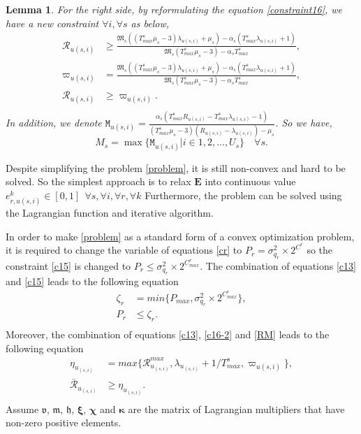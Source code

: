 \documentclass[conference]{IEEEtran}
\newtheorem{lemma}{Lemma}
\begin{document}
\begin{lemma}
For the right side, by reformulating the equation \eqref{constraint16}, we have a new constraint $\forall i, \forall s$ as below,
\begin{equation}\label{RM}
\begin{split}
\mathcal{R}_{u(s,i)} &\geq \frac{\mathfrak{M}_s ((T_{max}^s\mu_s-3)\lambda_{u(s,i)} + \mu_s) - \alpha_s(T_{max}^s\lambda_{u(s,i)} +1) }{\mathfrak{M}_s (T_{max}^s\mu_s-3)-\alpha_s T_{max}^s},\\
\varpi_{u(s,i)} &= \frac{\mathfrak{M}_s ((T_{max}^s\mu_s-3)\lambda_{u(s,i)} + \mu_s) - \alpha_s(T_{max}^s\lambda_{u(s,i)} +1) }{\mathfrak{M}_s (T_{max}^s\mu_s-3)-\alpha_s T_{max}^s},\\
\mathcal{R}_{u(s,i)} &\geq \varpi_{u(s,i)}. \\
\end{split}
\end{equation}
In addition, we denote $\mathtt{M}_{u(s,i)} = \frac{\alpha_s(T_{max}^s R_{u(s,i)}-T_{max}^s\lambda_{u(s,i)} -1)}{(T_{max}^s\mu_s-3)(R_{u(s,i)}-\lambda_{u(s,i)}) - \mu_s }$.
So we have,
\begin{equation}
M_s = \max\{\mathtt{M}_{u(s,i)} | i \in 1,2,..., U_s\} \quad \forall s .
\end{equation}
\end{lemma}
Despite simplifying the problem \eqref{problem}, it is still non-convex and hard to be solved.
So the simplest approach is to relax $\mathbf{E}$ into continuous value $e_{r,u(s,i)}^k \in [0,1] \:\: \forall s , \forall i ,\forall r, \forall k$
Furthermore, the problem can be solved using the Lagrangian function and iterative algorithm.

In order to make \eqref{problem} as a standard form of a convex optimization problem, it is required to change the variable of equations \eqref{cr} to $P_r = \sigma_{q_r}^2\times 2^{C^r}$ so the constraint 
\eqref{c15} is changed to
 $P_r \leq \sigma_{q_r}^2\times 2^{C^r_{max}}$.
The combination of equations \eqref{c13} and \eqref{c15} leads to the following equation
\begin{equation}
\begin{split}
\zeta_{r}&= min\{P_{max}, \sigma_{q_r}^2\times 2^{C^r_{max}} \}, \\
P_r &\leq  \zeta_{r}.\\
\end{split}
\end{equation} 
Moreover, the combination of equations \eqref{c13}, \eqref{c16-2} and \eqref{RM} leads to the following equation
\begin{equation}\label{RConstr}
\begin{split}
\eta_{u_{(s,i)}}&= max\{\mathcal{R}_{u_{(s,i)}}^{max}, \lambda_{u_{(s,i)}}+1/T^s_{max}, \varpi_{u(s,i)} \}, \\
\mathcal{\bar{R}}_{u_{(s,i)}} &\geq  \eta_{u_{(s,i)}}.\\
\end{split}
\end{equation}
Assume $\boldsymbol{\mathfrak{v}}$, $\boldsymbol{\mathfrak{m}}$, $\boldsymbol{\mathfrak{h}}$, $\boldsymbol{\xi}$, $\boldsymbol{\chi}$ and $\boldsymbol{ \kappa}$ are the matrix of Lagrangian multipliers that have non-zero positive elements.
\end{document}
